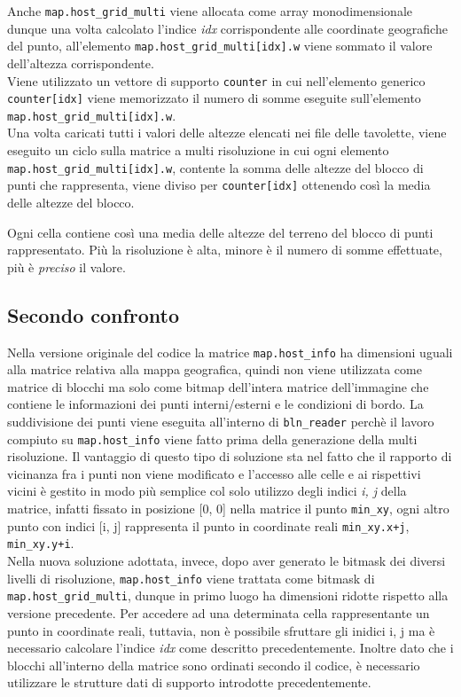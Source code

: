			Anche \texttt{map.host\_grid\_multi} viene allocata come array monodimensionale dunque una volta calcolato l'indice \textit{idx} corrispondente alle coordinate geografiche del punto, all'elemento \texttt{map.host\_grid\_multi[idx].w} viene sommato il valore dell'altezza corrispondente.\\
			Viene utilizzato un vettore di supporto \texttt{counter} in cui nell'elemento generico \texttt{counter[idx]} viene memorizzato il numero di somme eseguite sull'elemento \texttt{map.host\_grid\_multi[idx].w}.\\
			Una volta caricati tutti i valori delle altezze elencati nei file delle tavolette, viene eseguito un ciclo sulla matrice a multi risoluzione in cui ogni elemento \texttt{map.host\_grid\_multi[idx].w}, contente la somma delle altezze del blocco di punti che rappresenta, viene diviso per \texttt{counter[idx]} ottenendo cos\`{i} la media delle altezze del blocco.

			Ogni cella contiene cos\`{i} una media delle altezze del terreno del blocco di punti rappresentato. Pi\`{u} la risoluzione \`{e} alta, minore \`{e} il numero di somme effettuate, pi\`{u} \`{e} \textit{preciso} il valore.\\

		\subsection{Secondo confronto}
			Nella versione originale del codice la matrice \texttt{map.host\_info} ha dimensioni uguali alla matrice relativa alla mappa geografica, quindi non viene utilizzata come matrice di blocchi ma solo come bitmap dell'intera matrice dell'immagine che contiene le informazioni dei punti interni/esterni e le condizioni di bordo. La suddivisione dei punti viene eseguita all'interno di \texttt{bln\_reader} perch\`{e} il lavoro compiuto su \texttt{map.host\_info} viene fatto prima della generazione della multi risoluzione. Il vantaggio di questo tipo di soluzione sta nel fatto che il rapporto di vicinanza fra i punti non viene modificato e l'accesso alle celle e ai rispettivi vicini \`{e} gestito in modo pi\`{u} semplice col solo utilizzo degli indici \textit{i, j} della matrice, infatti fissato in posizione [0, 0] nella matrice il punto \texttt{min\_xy}, ogni altro punto con indici [i, j] rappresenta il punto in coordinate reali \texttt{min\_xy.x+j}, \texttt{min\_xy.y+i}.\\
			Nella nuova soluzione adottata, invece, dopo aver generato le bitmask dei diversi livelli di risoluzione, \texttt{map.host\_info} viene trattata come bitmask di \texttt{map.host\_grid\_multi}, dunque in primo luogo ha dimensioni ridotte rispetto alla versione precedente. Per accedere ad una determinata cella rappresentante un punto in coordinate reali, tuttavia, non \`{e} possibile sfruttare gli inidici i, j ma \`{e} necessario calcolare l'indice \textit{idx} come descritto precedentemente. Inoltre dato che i blocchi all'interno della matrice sono ordinati secondo il codice, \`{e} necessario utilizzare le strutture dati di supporto introdotte precedentemente.

